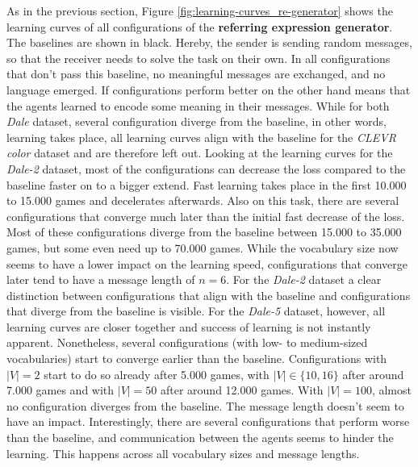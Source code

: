 As in the previous section, Figure \ref{fig:learning-curves_re-generator} shows the learning curves of all configurations of the \textbf{referring expression generator}.
The baselines are shown in black.
Hereby, the sender is sending random messages, so that the receiver needs to solve the task on their own.
In all configurations that don't pass this baseline, no meaningful messages are exchanged, and no language emerged.
If configurations perform better on the other hand means that the agents learned to encode some meaning in their messages.
While for both \emph{Dale} dataset, several configuration diverge from the baseline, in other words, learning takes place, all learning curves align with the baseline for the \emph{CLEVR color} dataset and are therefore left out.
Looking at the learning curves for the \emph{Dale-2} dataset, most of the configurations can decrease the loss compared to the baseline faster on to a bigger extend.
Fast learning takes place in the first 10.000 to 15.000 games and decelerates afterwards.
Also on this task, there are several configurations that converge much later than the initial fast decrease of the loss.
Most of these configurations diverge from the baseline between 15.000 to 35.000 games, but some even need up to 70.000 games.
While the vocabulary size now seems to have a lower impact on the learning speed, configurations that converge later tend to have a message length of $n=6$.
For the \emph{Dale-2} dataset a clear distinction between configurations that align with the baseline and configurations that diverge from the baseline is visible.
For the \emph{Dale-5} dataset, however, all learning curves are closer together and success of learning is not instantly apparent.
Nonetheless, several configurations (with low- to medium-sized vocabularies) start to converge earlier than the baseline.
Configurations with $|V|=2$ start to do so already after 5.000 games, with $|V|\in\{10,16\}$ after around 7.000 games and with $|V|=50$ after around 12.000 games.
With $|V|=100$, almost no configuration diverges from the baseline.
The message length doesn't seem to have an impact.
Interestingly, there are several configurations that perform worse than the baseline, and communication between the agents seems to hinder the learning.
This happens across all vocabulary sizes and message lengths.

